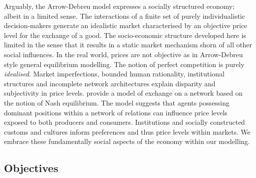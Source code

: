 
Arguably, the Arrow-Debreu model expresses a socially structured economy; albeit in a limited sense. The interactions of a finite set of purely individualistic decision-makers generate an idealistic market characterised by an objective price level for the exchange of a good. The socio-economic structure developed here is limited in the sense that it results in a static market mechanism shorn of all other social influences. In the real world, prices are not objective as in Arrow-Debreu style general equilibrium modelling. The notion of perfect competition is purely \emph{idealised}. Market imperfections, bounded human rationality, institutional structures and incomplete network architectures explain disparity and subjectivity in price levels. \citet{Blume2009} provide a model of exchange on a network based on the notion of Nash equilibrium. The model suggests that agents possessing dominant positions within a network of relations can influence price levels exposed to both producers and consumers. Institutions and socially constructed customs and cultures inform preferences and thus price levels within markets. We embrace these fundamentally social aspects of the economy within our modelling.

\subsection{Objectives}

